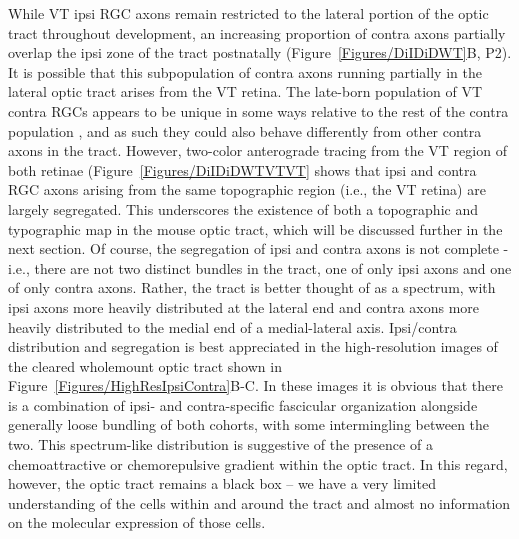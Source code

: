While VT ipsi RGC axons remain restricted to the lateral portion of the optic tract throughout development, an increasing proportion of contra axons partially overlap the ipsi zone of the tract postnatally (Figure~\ref{Figures/DiIDiDWT}B, P2).
It is possible that this subpopulation of contra axons running partially in the lateral optic tract arises from the VT retina.
The late-born population of VT contra RGCs appears to be unique in some ways relative to the rest of the contra population \cite{williams2006role}, and as such they could also behave differently from other contra axons in the tract.
However, two-color anterograde tracing from the VT region of both retinae (Figure~\ref{Figures/DiIDiDWTVTVT} shows that ipsi and contra RGC axons arising from the same topographic region (i.e., the VT retina) are largely segregated.
This underscores the existence of both a topographic and typographic map in the mouse optic tract, which will be discussed further in the next section.
Of course, the segregation of ipsi and contra axons is not complete - i.e., there are not two distinct bundles in the tract, one of only ipsi axons and one of only contra axons.
Rather, the tract is better thought of as a spectrum, with ipsi axons more heavily distributed at the lateral end and contra axons more heavily distributed to the medial end of a medial-lateral axis.
Ipsi/contra distribution and segregation is best appreciated in the high-resolution images of the cleared wholemount optic tract shown in Figure~\ref{Figures/HighResIpsiContra}B-C.
In these images it is obvious that there is a combination of ipsi- and contra-specific fascicular organization alongside generally loose bundling of both cohorts, with some intermingling between the two.
This spectrum-like distribution is suggestive of the presence of a chemoattractive or chemorepulsive gradient within the optic tract.
In this regard, however, the optic tract remains a black box -- we have a very limited understanding of the cells within and around the tract and almost no information on the molecular expression of those cells.

